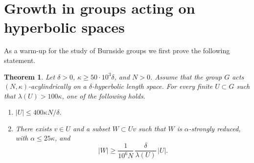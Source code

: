 \documentclass[11pt]{article}
\theoremstyle{plain}
\newtheorem{thm}{Theorem}[section]
\theoremstyle{definition}
\begin{document}
\section{Growth in groups acting on hyperbolic spaces}\label{S: basepoint}

As a warm-up for the study of Burnside groups we first prove the following statement.

\begin{thm}\label{T: main acylindrical}
Let $\delta >0$, $\kappa\geqslant 50\cdot 10^3\delta$, and $N>0$.
Assume that the group $G$ acts $(N,\kappa)$-acylindrically on a $\delta$-hyperbolic length space.
For every finite $U\subset G$ such that $\lambda(U)> 100\kappa$, one of the following holds.
\begin{enumerate}
\item $\displaystyle |U| \leq 400\kappa N/\delta$.
\item There exists $v \in U$ and a subset $W \subset Uv$ such that $W$ is $\alpha$-strongly reduced, with $\alpha \leq 25\kappa$, and
\begin{equation*}
|W| \geq \frac 1{10^6N}\,\frac \delta{\lambda(U)}\, |U|.
\end{equation*}
\end{enumerate}

\end{thm}
\end{document}
